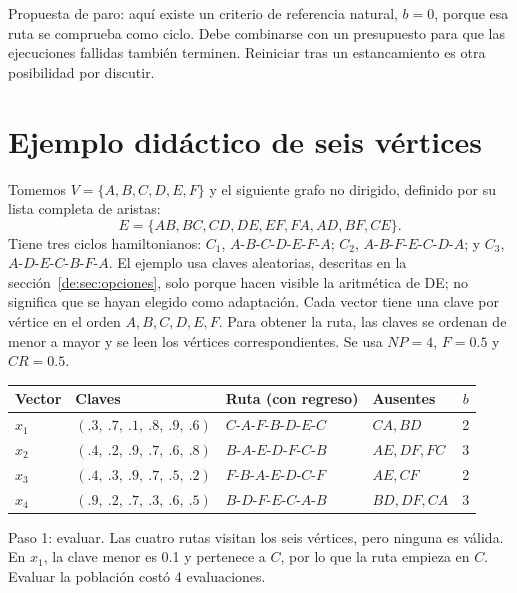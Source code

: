 Propuesta de paro: aquí existe un criterio de referencia natural, $b=0$, porque esa ruta se comprueba como ciclo. Debe combinarse con un presupuesto para que las ejecuciones fallidas también terminen. Reiniciar tras un estancamiento es otra posibilidad por discutir.

\section{Ejemplo didáctico de seis vértices}\label{de:sec:ejemplo}
Tomemos $V=\{A,B,C,D,E,F\}$ y el siguiente grafo no dirigido, definido por su lista completa de aristas:
\[
E=\{AB,BC,CD,DE,EF,FA,AD,BF,CE\}.
\]
Tiene tres ciclos hamiltonianos: $C_1$, $A\text{-}B\text{-}C\text{-}D\text{-}E\text{-}F\text{-}A$; $C_2$, $A\text{-}B\text{-}F\text{-}E\text{-}C\text{-}D\text{-}A$; y $C_3$, $A\text{-}D\text{-}E\text{-}C\text{-}B\text{-}F\text{-}A$. El ejemplo usa claves aleatorias, descritas en la sección~\ref{de:sec:opciones}, solo porque hacen visible la aritmética de DE; no significa que se hayan elegido como adaptación. Cada vector tiene una clave por vértice en el orden $A,B,C,D,E,F$. Para obtener la ruta, las claves se ordenan de menor a mayor y se leen los vértices correspondientes. Se usa $NP=4$, $F=0.5$ y $CR=0.5$.

\begin{center}

\begin{adjustbox}{max width=\linewidth}
\begin{tabular}{@{}lP{5cm}P{4.3cm}P{3cm}c@{}}
\toprule
Vector & Claves & Ruta (con regreso) & Ausentes & $b$\\
\midrule
$x_1$ & $(.3,\ .7,\ .1,\ .8,\ .9,\ .6)$ & $C\text{-}A\text{-}F\text{-}B\text{-}D\text{-}E\text{-}C$ & $CA,BD$ & 2\\
$x_2$ & $(.4,\ .2,\ .9,\ .7,\ .6,\ .8)$ & $B\text{-}A\text{-}E\text{-}D\text{-}F\text{-}C\text{-}B$ & $AE,DF,FC$ & 3\\
$x_3$ & $(.4,\ .3,\ .9,\ .7,\ .5,\ .2)$ & $F\text{-}B\text{-}A\text{-}E\text{-}D\text{-}C\text{-}F$ & $AE,CF$ & 2\\
$x_4$ & $(.9,\ .2,\ .7,\ .3,\ .6,\ .5)$ & $B\text{-}D\text{-}F\text{-}E\text{-}C\text{-}A\text{-}B$ & $BD,DF,CA$ & 3\\
\bottomrule
\end{tabular}
\end{adjustbox}
\end{center}

\noindent Paso 1: evaluar. Las cuatro rutas visitan los seis vértices, pero ninguna es válida. En $x_1$, la clave menor es 0.1 y pertenece a $C$, por lo que la ruta empieza en $C$. Evaluar la población costó 4 evaluaciones.

